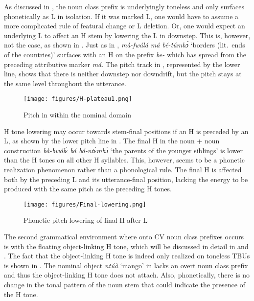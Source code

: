 As discussed in , the noun class prefix is underlyingly toneless and only surfaces phonetically as L in isolation. If it was marked L, one would have to assume a more complicated rule of featural change or L deletion. Or, one would expect an underlying L to affect an H stem by lowering the L in downstep.   This is, however, not the case, as shown in . Just as in , {\itshape mà-fwálá má bé-túmbɔ́} `borders (lit.\ ends of the countries)' surfaces with an H on the prefix {\itshape be-} which has spread from the preceding attributive marker {\itshape má}. The pitch track in , represented by the lower line, shows that there is neither downstep nor downdrift, but the pitch stays at the same level throughout the utterance.%

\begin{figure}
\texttt{[image: figures/H-plateau1.png]}
\caption{Pitch in {\HTS} within the nominal domain}
\label{Fig:pitchHTS}
\end{figure}

H tone lowering may occur towards stem-final positions if an H is preceded by an L, as shown by the lower pitch line in . The final H in the noun + noun construction {\itshape bà-bwálɛ̀ bá bá-ntɛ̀mbɔ́} `the parents of the younger siblings' is lower than the H tones on all other H syllables.  This, however, seems to be a phonetic realization phenomenon rather than a phonological rule. The final H is affected both by the preceding L and its utterance-final position, lacking the energy to be produced with the same pitch as the preceding H tones.


\begin{figure}
\texttt{[image: figures/Final-lowering.png]}
\caption{Phonetic pitch lowering of final H after L}
\label{Fig:FinalLow}
\end{figure}






The second grammatical environment where {\HTS} onto CV noun class prefixes occurs is with the floating object-linking H tone, which will be discussed in detail in  and . The fact that the object-linking H tone is indeed only realized on toneless TBUs is shown in . The nominal object {\itshape ntúà} `mango' in  lacks an overt noun class prefix and thus the object-linking H tone does not attach. Also, phonetically, there is no change in the tonal pattern of the noun stem that could indicate the presence of the H tone.


